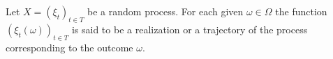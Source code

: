 Let $X = (\xi_t)_{t \in T}$ be a random process. For each given $\omega \in \Omega$ the function $(\xi_t(\omega))_{t \in T}$ is said to be a realization or a trajectory of the process corresponding to the outcome $\omega$.

